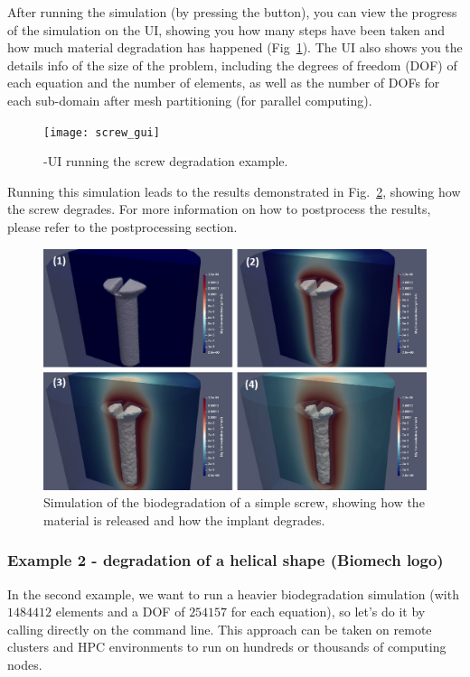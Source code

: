 After running the simulation (by pressing the  button), you can view the progress of the simulation on the UI, showing you how many steps have been taken and how much material degradation has happened (Fig~\ref{fig:screw_gui}). The UI also shows you the details info of the size of the problem, including the degrees of freedom (DOF) of each equation and the number of elements, as well as the number of DOFs for each sub-domain after mesh partitioning (for parallel computing). 

\begin{figure}[h]
\center \texttt{[image: screw\_gui]}
\caption{\biodeg{}-UI running the screw degradation example.} \label{fig:screw_gui}
\end{figure}

Running this simulation leads to the results demonstrated in Fig.~\ref{fig:screw_degradation}, showing how the screw degrades. For more information on how to postprocess the results, please refer to the postprocessing section.

\begin{figure}[h]
\center \includegraphics[width=15cm]{screw_degradation}
\caption{Simulation of the biodegradation of a simple screw, showing how the material is released and how the implant degrades.} \label{fig:screw_degradation}
\end{figure}


\subsubsection{Example 2 - degradation of a helical shape (Biomech logo)}\label{sec:example2}

In the second example, we want to run a heavier biodegradation simulation (with $\num{1484412}$ elements and a DOF of $\num{254157}$ for each equation), so let's do it by calling \biodeg{} directly on the command line. This approach can be taken on remote clusters and HPC environments to run \biodeg{} on hundreds or thousands of computing nodes. 

